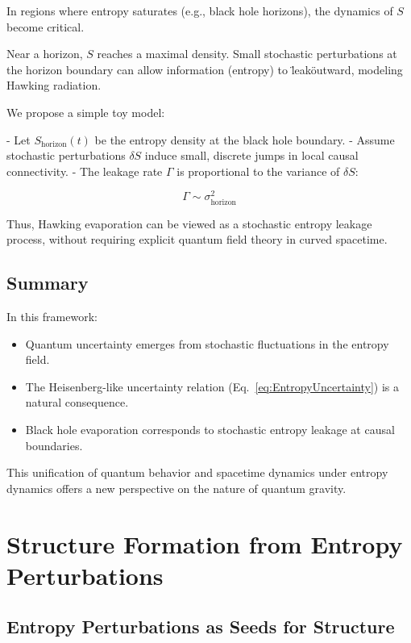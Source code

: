 \documentclass{article}
\begin{document}
In regions where entropy saturates (e.g., black hole horizons), the dynamics of $S$ become critical.

Near a horizon, $S$ reaches a maximal density.
Small stochastic perturbations at the horizon boundary can allow information (entropy) to \"leak\" outward, modeling Hawking radiation.

We propose a simple toy model:

- Let $S_{\text{horizon}}(t)$ be the entropy density at the black hole boundary.
- Assume stochastic perturbations $\delta S$ induce small, discrete jumps in local causal connectivity.
- The leakage rate $\Gamma$ is proportional to the variance of $\delta S$:

\begin{equation}
\Gamma \sim \sigma_{\text{horizon}}^2
\end{equation}

Thus, Hawking evaporation can be viewed as a stochastic entropy leakage process, without requiring explicit quantum field theory in curved spacetime.

\subsection{Summary}

In this framework:
\begin{itemize}
    \item Quantum uncertainty emerges from stochastic fluctuations in the entropy field.
    \item The Heisenberg-like uncertainty relation (Eq.~\eqref{eq:EntropyUncertainty}) is a natural consequence.
    \item Black hole evaporation corresponds to stochastic entropy leakage at causal boundaries.
\end{itemize}

This unification of quantum behavior and spacetime dynamics under entropy dynamics offers a new perspective on the nature of quantum gravity.

\section{Structure Formation from Entropy Perturbations}

\subsection{Entropy Perturbations as Seeds for Structure}
\end{document}
